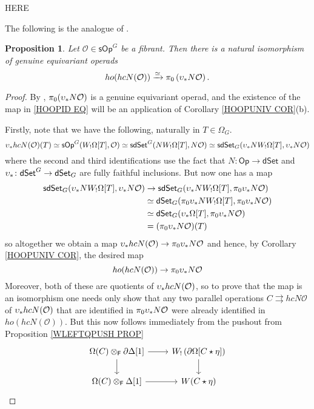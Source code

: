 \documentclass[a4paper,10pt
,draft
]{article}%
\numberwithin{equation}{section}
\numberwithin{figure}{section}
\newtheorem{proposition}[equation]{Proposition}%
\theoremstyle{definition} %
\newcommand{\dSet}{\mathsf{dSet}}
\renewcommand{\O}{\ensuremath{\mathcal O}}
\newcommand{\1}{\ensuremath{\mathbbm 1}}%
\begin{document}
{\color{red} HERE}

The following is the analogue of \cite[Prop. 4.8]{CM13b}.

\begin{proposition}
      \label{HOOPID_PROP}
Let $\mathcal{O} \in \mathsf{sOp}^G$
be a fibrant. 
Then there is a natural isomorphism of genuine equivariant operads
\begin{equation}\label{HOOPID EQ}
ho(hcN(\mathcal{O})) \xrightarrow{\simeq}
\pi_0 \left( \upsilon_{\**} N\mathcal{O} \right).
\end{equation}
\end{proposition}


\begin{proof}
      By \cite[Prop. 5.9]{BP_edss}, $\pi_0(\upsilon_{\**}N\O)$ is a genuine equivariant operad,
      and the existence of the map in \eqref{HOOPID EQ}
      will be an application of
      Corollary \ref{HOOPUNIV COR}(b).

Firstly,
note that we have the following, naturally in $T \in \Omega_G$.
\[
\upsilon_{\**}hcN(\O)(T)
\simeq
\mathsf{sOp}^G(W_!\Omega[T],\O)
\simeq
\mathsf{sdSet}^G(N W_!\Omega[T],N \O)
\simeq 
\mathsf{sdSet}_G(\upsilon_{\**}N W_!\Omega[T],\upsilon_{\**}N \O)
\]
where the second and third identifications use the fact that 
$N\colon \mathsf{Op} \to \mathsf{dSet}$ and $\upsilon_{\**} \colon \dSet^G \to \dSet_G$
are fully faithful inclusions. 
But now one has a map
\begin{align*}
  \mathsf{sdSet}_G(\upsilon_{\**}N W_!\Omega[T],\upsilon_{\**}N \O)
  & \to
    \mathsf{sdSet}_G(\upsilon_{\**}N W_!\Omega[T],\pi_0\upsilon_{\**}N \O)
  \\ & \simeq
       \mathsf{dSet}_G(\pi_0 \upsilon_{\**}  N W_!\Omega[T],\pi_0\upsilon_{\**}N \O)
  \\ & \simeq
       \mathsf{dSet}_G(\upsilon_{\**}\Omega[T],\pi_0\upsilon_{\**}N \O)
  \\ & =
       (\pi_0\upsilon_{\**}N \O)(T)
\end{align*}
so altogether we obtain a map
$\upsilon_{\**}hcN(\O) \to \pi_0 \upsilon_{\**} N \O$
and hence, by Corollary \ref{HOOPUNIV COR},
the desired map 
\[ho(hcN(\O)) \to \pi_0 \upsilon_{\**} N \O\]
Moreover, both of these are quotients of $\upsilon_{\**}hcN(\O)$,
so to prove that the map is an isomorphism one needs only show that any two parallel operations $C \rightrightarrows hcN \O$ of $\upsilon_{\**}hcN(\O)$
that are identified in 
$\pi_0 \upsilon_{\**} N \O$
were already identified in 
$ho(hcN(\O))$.
But this now follows immediately from the pushout from Proposition \ref{WLEFTQPUSH PROP}
\[
\begin{tikzcd}
	\Omega(C) \otimes_{\mathsf{F}}
	\partial \Delta[1]
	\ar{r} \ar{d}
&
	W_! \left(\partial \Omega[C \star \eta]\right) 
	\ar{d}
\\
	\Omega(C) \otimes_{\mathsf{F}}
	\Delta[1]
	\ar{r}
&
	W(C \star \eta)
\end{tikzcd}
\]
\end{proof}
\end{document}
